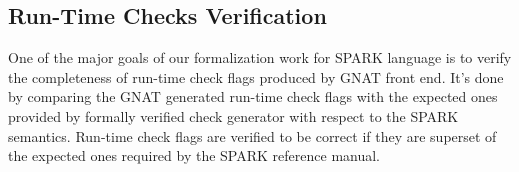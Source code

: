 \subsection{Run-Time Checks Verification}
One of the major goals of our formalization work for SPARK language is
to verify the completeness of run-time check flags produced by GNAT front
end. It's done by comparing the GNAT generated run-time check flags with the
expected ones provided by formally verified check generator with respect to the
SPARK semantics. Run-time check flags are verified to be correct if they are
superset of the expected ones required by the SPARK reference manual.












